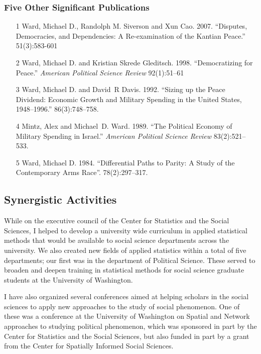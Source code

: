 \documentclass[pdftex,12pt,fullpage,oneside]{amsart}
\begin{document}
\subsubsection*{Five Other Significant Publications}
\begin{itemize}

\item[1] Ward, Michael D., Randolph M. Siverson and Xun
  Cao. 2007. ``Disputes, Democracies, and Dependencies: A
  Re-examination of the Kantian Peace.''  51(3):583-601
   
\item[2] Ward, Michael D. and Kristian Skrede
  Gleditsch. 1998. ``Democratizing for Peace.'' \newblock
  {\textit{American Political Science Review}} 92(1):51--61
 
\item[3] Ward, Michael D. and David~R Davis. 1992. ``Sizing up the
  Peace Dividend: Economic Growth and Military Spending in the {United
    States}, 1948--1996.''  86(3):748--758.
 
\item[4] Mintz, Alex and Michael~D. Ward. 1989. ``The Political
  Economy of Military Spending in {I}srael.''  \newblock
  {\textit{American Political Science Review}} 83(2):521--533.

\item[5]
Ward, Michael D. 1984. ``Differential Paths to Parity: A Study of the Contemporary Arms Race''.
 78(2):297--317.

\end{itemize}
\subsection*{Synergistic Activities}
While on the executive council of the Center for Statistics and the
Social Sciences, I helped to develop a university wide curriculum in
applied statistical methods that would be available to social science
departments across the university. We also created new fields of
applied statistics within a total of five departments; our first was
in the department of Political Science. These served to broaden and
deepen training in statistical methods for social science graduate
students at the University of Washington.

I have also organized several conferences aimed at helping scholars in
the social sciences to apply new approaches to the study of social
phenomenon. One of these was a conference at the University of
Washington on Spatial and Network approaches to studying political
phenomenon, which was sponsored in part by the Center for Statistics
and the Social Sciences, but also funded in part by a grant from the
Center for Spatially Informed Social Sciences.
\end{document}
